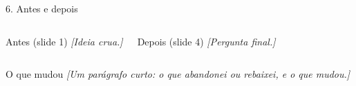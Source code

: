 \documentclass[aspectratio=169,11pt]{beamer}
\newcommand{\preencher}[1]{\textcolor{mplace}{\textit{[#1]}}}
\begin{document}
\begin{frame}[t]{6. Antes e depois}
  \begin{columns}[T]
      \begin{bloco}{Antes (slide 1)}
        \small\preencher{Ideia crua.}
      \end{bloco}
      \begin{bloco}{Depois (slide 4)}
        \small\preencher{Pergunta final.}
      \end{bloco}
  \end{columns}

  \vspace{0.3cm}
  \begin{bloco}{O que mudou}
    \small
    \preencher{Um parágrafo curto: o que abandonei ou rebaixei, e o que mudou.}
  \end{bloco}
\end{frame}
\end{document}
